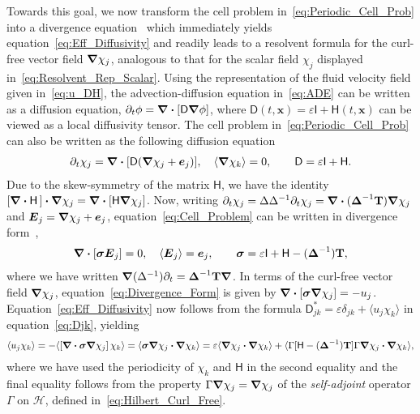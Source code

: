\documentclass[leqno,onefignum,onetabnum]{siamltex1213}
\newcommand{\Tb}{\mathbf{T}}
\newcommand{\Hc}{\mathcal{H}}
\newcommand{\Dm}{\mathsf{D}}
\newcommand{\Hm}{\mathsf{H}}
\newcommand{\Ib}{\mathsf{I}}
\newcommand\bsig{\mbox{\boldmath${\sigma}$}}
\newcommand\bDelta{\mbox{\boldmath${\Delta}$}}
\newcommand\bnabla{\mbox{\boldmath${\nabla}$}}
\providecommand\bcdot{\boldsymbol{\cdot}}
\newcommand{\vecE}{\boldsymbol{E}}
\newcommand{\vecx}{\boldsymbol{x}}
\newcommand{\vece}{\boldsymbol{e}}
\begin{document}
Towards this goal, we now transform the cell problem
in~\eqref{eq:Periodic_Cell_Prob} into a divergence
equation~\cite{Fannjiang:SIAM_JAM:333} which immediately yields
equation~\eqref{eq:Eff_Diffusivity} and readily leads to a resolvent
formula for the curl-free vector field $\bnabla\chi_j$, analogous to that
for the scalar field $\chi_j$ displayed in~\eqref{eq:Resolvent_Rep_Scalar}. Using the
representation of the fluid velocity field given in~\eqref{eq:u_DH}, the
advection-diffusion equation in~\eqref{eq:ADE} can be written as a
diffusion equation, $\partial_t\phi=\bnabla \bcdot[\Dm\bnabla\phi]$, where
$\Dm(t,\vecx)=\varepsilon\Ib+\Hm(t,\vecx)$ can be viewed as a local diffusivity
tensor. The cell problem in~\eqref{eq:Periodic_Cell_Prob} can also be
written as the following diffusion
equation~\cite{Fannjiang:SIAM_JAM:333}     
% 
\begin{align}\label{eq:Cell_Problem}
  \partial_t\chi_j=\bnabla \bcdot[\Dm(\bnabla \chi_j+\vece_j)],
  \quad
  \langle\bnabla \chi_k\rangle=0, \qquad
  \Dm=\varepsilon\Ib+\Hm.
\end{align}
%
Due to the skew-symmetry of the matrix $\Hm$, we have the identity
$[\bnabla\bcdot\Hm\,]\bcdot\bnabla\chi_j=\bnabla\bcdot[\Hm\bnabla\chi_j]$.
Now, writing $\partial_t\chi_j=\Delta\Delta^{-1}\partial_t\chi_j=\bnabla\bcdot(\bDelta^{-1}\Tb)\bnabla\chi_j$ and
$\vecE_j=\bnabla\chi_j+\vece_j$, equation~\eqref{eq:Cell_Problem} can be
written in divergence form~\cite{Fannjiang:SIAM_JAM:333},   
%
\begin{align}\label{eq:Divergence_Form}
  \bnabla\bcdot[\bsig\vecE_j]=0,
  \quad
  \langle\vecE_j\rangle=\vece_j,
  \qquad
  \bsig=\varepsilon\Ib+\Hm-(\bDelta^{-1})\Tb,
\end{align}
%
where we have written
$\bnabla(\Delta^{-1})\partial_t=\bDelta^{-1}\Tb\bnabla$. In terms of the curl-free
vector field $\bnabla\chi_j$, equation~\eqref{eq:Divergence_Form} is
given by
$\bnabla\bcdot[\bsig\bnabla\chi_j]=-u_j$. Equation~\eqref{eq:Eff_Diffusivity} 
now follows from the formula $\Dm^*_{jk}=\varepsilon\delta_{jk}+\langle u_j\chi_k\rangle$ in
equation~\eqref{eq:Djk}, yielding
%
\begin{align}\label{eq:Functional_Rep}
  \langle u_j\chi_k\rangle=-\langle[\bnabla\bcdot\bsig\bnabla\chi_j]\,\chi_k\rangle
       =\langle\bsig\bnabla\chi_j\bcdot\bnabla\chi_k\rangle      
       =\varepsilon\langle\bnabla\chi_j\bcdot\bnabla\chi_k\rangle
         +\langle\Gamma[\Hm-(\bDelta^{-1})\Tb]\Gamma\bnabla\chi_j\bcdot\bnabla\chi_k\rangle,       
\end{align}
%
where we have used the periodicity of $\chi_k$ and $\Hm$ in the second
equality and the final equality follows from the property
$\Gamma\bnabla\chi_j=\bnabla\chi_j$ of the \emph{self-adjoint} operator $\Gamma$ on
$\Hc$, defined in~\eqref{eq:Hilbert_Curl_Free}.
\end{document}

